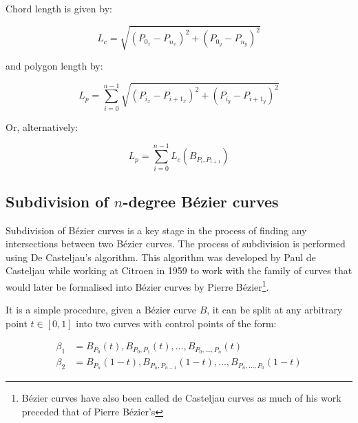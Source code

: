 Chord length is given by:

\begin{equation}\label{eq:bezlength}
  L_{c} = \sqrt{\left(P_{0_{x}} - P_{n_{x}}\right)^{2} + \left(P_{0_{y}} - P_{n_{y}}\right)^{2}}
\end{equation}

and polygon length by:

\begin{equation}
  L_{p} = \sum_{i=0}^{n-1} \sqrt{\left(P_{i_{x}} - P_{i+1_{x}}\right)^{2} + \left(P_{i_{y}} - P_{i+1_{y}}\right)^{2}}
\end{equation}

Or, alternatively:

\begin{equation}
  L_{p} = \sum_{i=0}^{n-1} L_{c}(B_{P_{i},P_{i+1}})
\end{equation}

\subsection{Subdivision of $n$-degree Bézier curves}
\label{sec:decasteljau}

Subdivision of Bézier curves is a key stage in the process of finding any intersections between two Bézier curves. The process of subdivision is performed using De Casteljau's algorithm. This algorithm was developed by Paul de Casteljau while working at Citroen in 1959 to work with the family of curves that would later be formalised into Bézier curves by Pierre Bézier\footnote{Bézier curves have also been called de Casteljau curves as much of his work preceded that of Pierre Bézier's}.

It is a simple procedure, given a Bézier curve $B$, it can be split at any arbitrary point $t \in [0,1]$ into two curves with control points of the form:

\begin{align}
  \beta_{1} &= B_{P_{0}}(t), B_{P_{0},P_1}(t), \ldots, B_{P_{0},\ldots,P_{n}}(t) \\
  \beta_{2} &= B_{P_{n}}(1-t), B_{P_{n},P_{n-1}}(1-t), \ldots, B_{P_{n},\ldots,P_{0}}(1-t)
\end{align}


